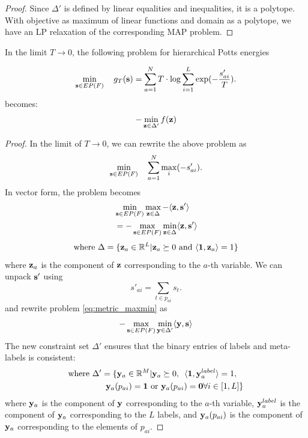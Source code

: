 {{\begin{proof}
    Since $\Delta'$ is defined by linear equalities and inequalities, it is a polytope. With objective as maximum of linear functions and domain as a polytope, we have an LP relaxation of the corresponding MAP problem.
\end{proof}


{\proposition In the limit $T \to 0$, the following problem for hierarchical Potts energies 

\begin{equation}
\min_{{\bf s} \in EP(F)} \quad g_T ({\bf s}) = \sum_{a = 1}^{N} T \cdot \log \sum_{i = 1}^L \exp(-\frac{s'_{ai}}{T}).
\end{equation}
becomes:
\begin{align}
    - \min_{{\bf z} \in \Delta'} f({\bf z}) 
\end{align}

\begin{proof}
In the limit of $T \to 0$, we can rewrite the above problem as
\begin{equation}
    \min_{{\bf s} \in EP(F)} \quad \sum_{a = 1}^{N} \max_{i} (-s'_{ai}).
\end{equation}
In vector form, the problem becomes
\begin{align}
    &\min_{{\bf s} \in EP(F)} \max_{{\bf z} \in \Delta} - \langle {\bf z}, {\bf s'} \rangle \\
    & = - \max_{{\bf s} \in EP(F)} \min_{{\bf z} \in \Delta} \langle {\bf z}, {\bf s'} \rangle
    \label{eq:metric_maxmin}
\end{align}
\begin{equation}
    \text{where } \Delta = \{{\bf z}_a \in \mathbb{R}^L | {\bf z}_a \succeq 0  \textrm{ and } \langle {\bf 1}, {\bf z}_a \rangle = 1\}
\end{equation}
where ${\bf z}_a$ is the component of $\bf z$ corresponding to the $a$-th variable. We can unpack $\bf s'$ using 
\begin{equation}
s'_{ai} = \sum_{t \in p_{ai}} s_t.
\end{equation}
and rewrite problem \eqref{eq:metric_maxmin} as
\begin{align}
    - \max_{{\bf s} \in EP(F)} \min_{{\bf y} \in \Delta'} \langle {\bf y}, {\bf s} \rangle
\end{align}
The new constraint set $\Delta'$ ensures that the binary entries of labels and meta-labels is consistent:
\begin{align}
    \textrm{where } \Delta' &= \{ {\bf y}_a \in \mathbb{R}^M | {\bf y}_a \succeq 0, \enskip \langle {\bf 1}, {\bf y}_a^{label} \rangle = 1, \nonumber \\
    &\enskip {\bf y}_a(p_{ai}) = {\bf 1} \textrm{ or } {\bf y}_a(p_{ai}) = {\bf 0} \forall i \in [1, L]\}
\end{align} 
where ${\bf y}_a$ is the component of $\bf y$ corresponding to the $a$-th variable, ${\bf y}_a^{label}$  is the component of ${\bf y}_a$ corresponding to the $L$ labels, and ${\bf y}_a(p_{ai})$ is the component of ${\bf y}_a$ corresponding to the elements of $p_{ai}$. 


\end{proof}}}}

